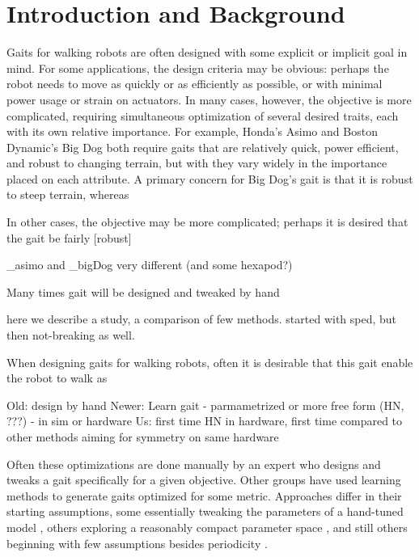 \section{Introduction and Background}



Gaits for walking robots are often designed with some explicit or
implicit goal in mind.  For some applications, the design criteria may
be obvious: perhaps the robot needs to move as quickly or as
efficiently as possible, or with minimal power usage or strain on
actuators.  In many cases, however, the objective is more complicated,
requiring simultaneous optimization of several desired traits, each
with its own relative importance.  For example, Honda's Asimo
\cite{_asmio} and Boston Dynamic's Big Dog \cite{_bigdog} both require
gaits that are relatively quick, power efficient, and robust to
changing terrain, but with they vary widely in the importance placed
on each attribute.  A primary concern for Big Dog's gait is that it is
robust to steep terrain, whereas

In other cases, the objective may be more complicated; perhaps it is
desired that the gait be fairly [robust]

\_asimo and \_bigDog very different (and some hexapod?)

Many times gait will be designed and tweaked by hand \cite{_asimo}

here we describe a study, a comparison of few methods. started with
sped, but then not-breaking as well.


When designing gaits for walking robots, often it is desirable that
this gait enable the robot to walk as

Old: design by hand
Newer: Learn gait
  - parmametrized or more free form (HN, ???)
  - in sim or hardware
Us: first time HN in hardware, first time compared to other methods aiming for symmetry on same hardware

Often
these optimizations are done manually by an expert who designs and
tweaks a gait specifically for a given objective.  Other groups have
used learning methods to generate gaits optimized for some metric.
Approaches differ in their starting assumptions, some essentially
tweaking the parameters of a hand-tuned model \cite{chernova}, others
exploring a reasonably compact parameter space \cite{kohl}, and still
others beginning with few assumptions besides periodicity
\cite{zykov}.





